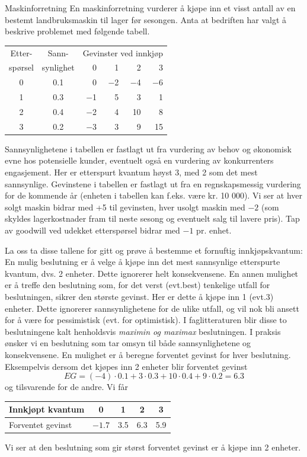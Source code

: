 \begin{eksempel}{Maskinforretning}
En maskinforretning vurderer å kjøpe inn et visst antall av en
bestemt landbruksmaskin til lager før sesongen.  Anta at bedriften
har valgt å beskrive problemet med følgende tabell.
\begin{center}
\begin{tabular}{c|c|rrrr}
Etter-     &    Sann-     & \multicolumn{4}{c}{Gevinster ved innkjøp}\\
spørsel &  synlighet   &       0  &  1  &  2  &  3 \\ \hline
   0       &   0.1        &       0  & $-$2  & $-$4  & $-$6 \\
   1       &   0.3        &      $-$1  &  5  &  3  &  1 \\
   2       &   0.4        &      $-$2  &  4  & 10  &  8 \\
   3       &   0.2        &      $-$3  &  3  &  9  & 15 \\ \hline
\end{tabular} 
\end{center}
Sannsynlighetene i tabellen er fastlagt ut fra vurdering av behov og 
øko\-no\-misk evne hos potensielle kunder, eventuelt også en vurdering
av konkurrenters engasjement.  Her er etterspurt kvantum høyst 3, 
med 2 som det mest sannsynlige.  Gevinstene i tabellen er fastlagt ut
fra en regnskapsmessig vurdering for de kommende år (enheten i
tabellen kan f.eks. være kr. 10 000).  Vi ser at hver solgt maskin 
bidrar med +5 til gevinsten, hver usolgt maskin med $-2$ (som skyldes 
lagerkostnader fram til neste sesong og eventuelt salg til lavere pris).
Tap av goodwill ved udekket etterspørsel bidrar med $-1$ pr. enhet.

La oss ta disse tallene for gitt og prøve å bestemme et fornuftig
inn\-kjøps\-kvan\-tum:  En mulig beslutning er å velge å kjøpe
inn det mest sannsynlige etterspurte kvantum, dvs. 2 enheter.  Dette
ignorerer helt konsekvensene.  En annen mulighet er å treffe den
beslutning som, for det verst (evt.best) tenkelige utfall for 
beslutningen, sikrer den største gevinst.  Her er dette å kjøpe
inn 1 (evt.3) enheter.  Dette ignorerer sannsynlighetene for de ulike
utfall, og vil nok bli ansett for å være for pessimistisk
(evt. for optimistisk).  I faglitteraturen blir disse to beslutningene
kalt henholdsvis {\em maximin og maximax} beslutningen.  I praksis
ønsker vi en beslutning som tar omsyn til både sannsynlighetene
og konsekvensene.  En mulighet er å beregne forventet gevinst for hver
beslutning.  Eksempelvis dersom det kjøpes inn 2 enheter blir
forventet gevinst
\[     EG = (-4) \cdot 0.1 + 3 \cdot 0.3 + 10 \cdot 0.4 + 9 \cdot 0.2 = 6.3 \]
og tilsvarende for de andre.  Vi får

\begin{center}
\begin{tabular}{l|cccc}
Innkjøpt kvantum    &      0     &     1     &     2     &     3 \\ \hline
Forventet gevinst      &   $-1.7$   &    3.5    &    6.3    &    5.9
\end{tabular}
\end{center}
Vi ser at den beslutning som gir størst forventet gevinst er å
kjøpe inn 2 enheter.
\end{eksempel}

